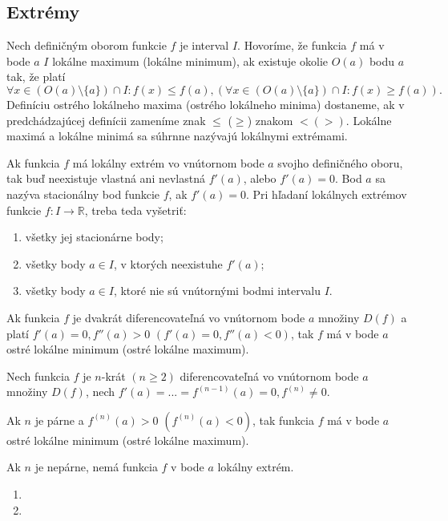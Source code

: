 \subsection{Extrémy}
Nech definičným oborom funkcie $f$ je interval $I$. Hovoríme, že funkcia $f$ má v bode $a$ $I$ lokálne maximum (lokálne minimum), ak existuje okolie $O(a)$ bodu $a$ tak, že platí
$$\forall x\in (O(a)\setminus \{a\})\cap I:f(x)\leq f(a),(\forall x\in (O(a)\setminus \{a\})\cap I:f(x)\geq f(a)).$$
Definíciu ostrého lokálneho maxima (ostrého lokálneho minima) dostaneme, ak v predchádzajúcej definícii zameníme znak $\leq$ ($\geq$) znakom $<(>)$. Lokálne maximá a lokálne minimá sa súhrnne nazývajú lokálnymi extrémami.

\begin{veta}
Ak funkcia $f$ má lokálny extrém vo vnútornom bode $a$ svojho definičného oboru, tak buď neexistuje vlastná ani nevlastná $f'(a)$, alebo $f'(a)=0$.
Bod $a$ sa nazýva stacionálny bod funkcie $f$, ak $f'(a)=0$.
Pri hľadaní lokálnych extrémov funkcie $f:I\rightarrow\mathbb{R}$, treba teda vyšetriť:
\begin{enumerate}
\item všetky jej stacionárne body;
\item všetky body $a\in I$, v ktorých neexistuhe $f'(a)$;
\item všetky body $a\in I$, ktoré nie sú vnútornými bodmi intervalu $I$.
\end{enumerate}
\end{veta}

\begin{veta}
Ak funkcia $f$ je dvakrát diferencovateľná vo vnútornom bode $a$ množiny $D(f)$ a platí $f'(a)=0,f''(a)>0$  $(f'(a)=0,f''(a)<0)$, tak $f$ má v bode $a$ ostré lokálne minimum (ostré lokálne maximum).
\end{veta}

\begin{veta}
Nech funkcia $f$ je $n$-krát $(n\geq 2)$ diferencovateľná vo vnútornom bode $a$ množiny $D(f)$, nech $f'(a)=...=f^{(n-1)}(a)=0,f^{(n)}\neq 0$.

Ak $n$ je párne a $f^{(n)}(a)>0$  $(f^{(n)}(a)<0)$, tak funkcia $f$ má v bode $a$ ostré lokálne minimum (ostré lokálne maximum).

Ak $n$ je nepárne, nemá funkcia $f$ v bode $a$ lokálny extrém.
\end{veta}

\begin{enumerate}[resume]
	\item {}
	\item {}
\end{enumerate}

